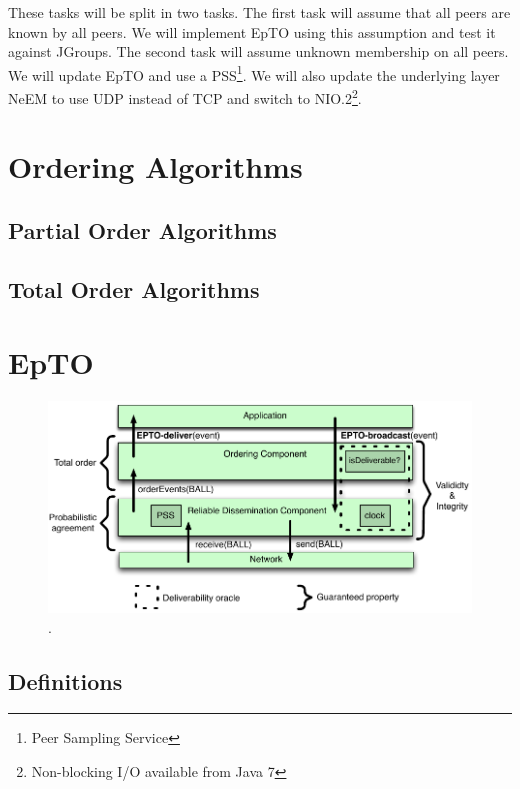 \documentclass[10pt,conference,a4paper]{IEEEtran}
\begin{document}
These tasks will be split in two tasks. The first task will assume that all peers are known by all peers. We will implement EpTO using this assumption and test it against JGroups. The second task will assume unknown membership on all peers. We will update EpTO and use a PSS\footnote{Peer Sampling Service}. We will also update the underlying layer NeEM to use UDP instead of TCP and switch to NIO.2\footnote{Non-blocking I/O available from Java 7}.

\section{Ordering Algorithms}
\subsection{Partial Order Algorithms}
\subsection{Total Order Algorithms}

\section{EpTO}
\begin{figure}
	\includegraphics[width=\linewidth]{figures/epto-architecture.png}
	\caption{\protect\footnotemark{}.}
	\label{fig:epto-architecture}
\end{figure}
\subsection{Definitions}
\end{document}
